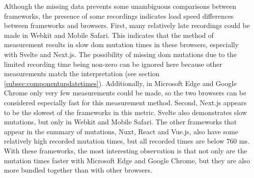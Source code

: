 \documentclass[a4paper, 12pt]{article}
\begin{document}
Although the missing data prevents some unambiguous comparisons between frameworks, the presence of some recordings indicates load speed differences between frameworks and browsers.
First, many relatively late recordings could be made in Webkit and Mobile Safari.
This indicates that the method of measurement results in slow \acrshort{dom} mutation times in these browsers, especially with Svelte and Next.js.
The possibility of missing \acrshort{dom} mutations due to the limited recording time being non-zero can be ignored here because other measurements match the interpretation (see section \ref{subsec:componentupdatetimes}). %
Additionally, in Microsoft Edge and Google Chrome only very few measurements could be made, so the two browsers can be considered especially fast for this measurement method.
Second, Next.js appears to be the slowest of the frameworks in this metric.
Svelte also demonstrates slow mutations, but only in Webkit and Mobile Safari.
The other frameworks that appear in the summary of mutations, Nuxt, React and Vue.js, also have some relatively high recorded mutation times, but all recorded times are below 760 ms.
With these frameworks, the most interesting observation is that not only are the mutation times faster with Microsoft Edge and Google Chrome, but they are also more bundled together than with other browsers.
\end{document}
